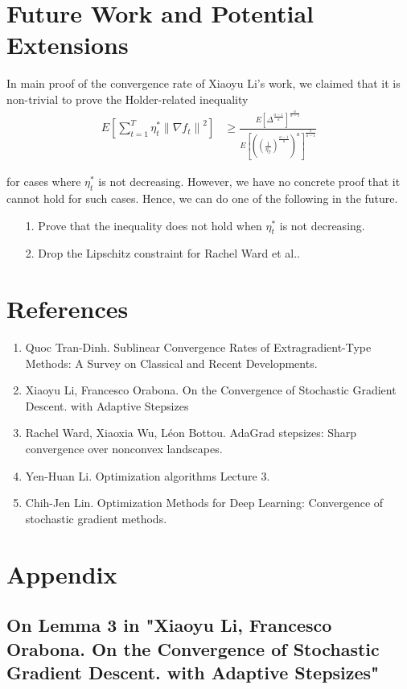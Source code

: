 \documentclass[14pt,onecolumn,letterpaper]{extarticle}
\begin{document}
\section{Future Work and Potential Extensions}
In main proof of the convergence rate of Xiaoyu Li's work, we claimed that it is non-trivial to prove the Holder-related inequality 
\begin{align*} E\left[\sum_{t=1}^T \eta_t^*\left\|\nabla f_t\right\|^2\right] & \geq \frac{E\left[\Delta^{\frac{a-1}{a}}\right]^{\frac{a}{a-1}}}{E\left[\left(\left(\frac{1}{\eta_T}\right)^{\frac{a-1}{a}}\right)^{a}\right]^{\frac{1}{a-1}}}\end{align*} 

for cases where $\eta_t^*$ is not decreasing. However, we have no concrete proof that it cannot hold for such cases. Hence, we can do one of the following in the future.
\begin{enumerate}
        \item [1.] Prove that the inequality does not hold when $\eta_t^*$ is not decreasing.
        \item [2.] Drop the Lipschitz constraint for Rachel Ward et al..
        
\end{enumerate}

\section{References}
\begin{enumerate}
    \item Quoc Tran-Dinh. Sublinear Convergence Rates of Extragradient-Type Methods: A
Survey on Classical and Recent Developments. 
    \item Xiaoyu Li, Francesco Orabona. On the Convergence of Stochastic Gradient Descent.
with Adaptive Stepsizes
    \item Rachel Ward, Xiaoxia Wu, Léon Bottou. AdaGrad stepsizes: Sharp convergence over nonconvex
landscapes.
    \item Yen-Huan Li. Optimization algorithms Lecture 3.
    \item Chih-Jen Lin. Optimization Methods for Deep Learning: Convergence of stochastic gradient methods.
\end{enumerate}
\section{Appendix}
\subsection{On Lemma 3 in "Xiaoyu Li, Francesco Orabona. On the Convergence of Stochastic Gradient Descent. with Adaptive Stepsizes"}
\end{document}

